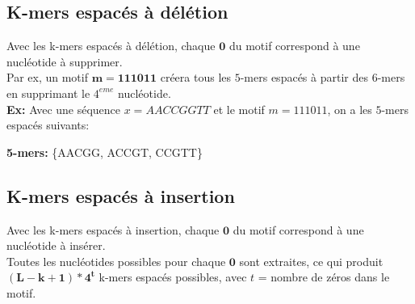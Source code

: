 \documentclass{report}
\begin{document}
      \subsection{K-mers espacés à délétion}
        Avec les k-mers espacés à délétion, chaque $\mathbf{0}$ du motif correspond à une nucléotide à supprimer.\\
        Par ex, un motif $\mathbf{m=111011}$ créera tous les $5$-mers espacés à partir des $6$-mers en supprimant le $4^{eme}$ nucléotide.\bigskip\\
        \textbf{Ex:} Avec une séquence $x = AACCGGTT$ et le motif $m = 111011$, on a les $5$-mers espacés suivants:\\
        \begin{center}\end{center}
        \textbf{5-mers:} \{AACGG, ACCGT, CCGTT\}
      \subsection{K-mers espacés à insertion}
        Avec les k-mers espacés à insertion, chaque $\mathbf{0}$ du motif correspond à une nucléotide à insérer.\\
        Toutes les nucléotides possibles pour chaque $\mathbf{0}$ sont extraites, ce qui produit $\mathbf{\left(L - k + 1 \right)*4^t}$ k-mers espacés possibles, avec $t$ = nombre de zéros dans le motif.\\
\end{document}
